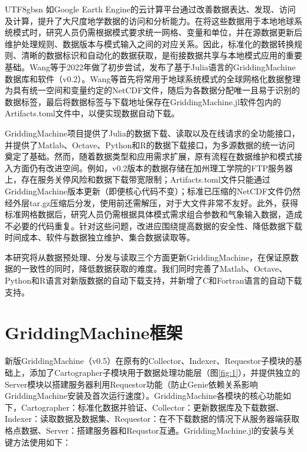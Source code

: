 \documentclass[numdoi]{chinese}
\begin{document}
\begin{CJK}{UTF8}{gbsn}
如Google Earth Engine的云计算平台通过改善数据表达、\allowbreak{}发现、\allowbreak{}访问及计算，提升了大尺度地学数据的访问和分析能力\cite{ref1}。在将这些数据用于本地地球系统模式时，研究人员仍需根据模式要求统一网格、\allowbreak{}变量和单位，并在源数据更新后维护处理规则、\allowbreak{}数据版本与模式输入之间的对应关系。因此，标准化的数据转换规则、\allowbreak{}清晰的数据标识和自动化的数据获取，是衔接数据共享与本地模式应用的重要基础。Wang等\cite{ref2}于2022年做了初步尝试，发布了基于Julia语言的GriddingMachine数据库和软件（v0.2）。Wang等\cite{ref2}首先将常用于地球系统模式的全球网格化数据整理为具有统一空间和变量约定的NetCDF文件，随后为各数据分配唯一且易于识别的数据标签，最后将数据标签与下载地址保存在GriddingMachine.jl软件包内的Artifacts.toml文件中，以便实现数据自动下载。

GriddingMachine项目提供了Julia的数据下载、读取以及在线请求的全功能接口，并提供了Matlab、Octave、Python和R的数据下载接口，为多源数据的统一访问奠定了基础。然而，随着数据类型和应用需求扩展，原有流程在数据维护和模式接入方面仍有改进空间。例如，v0.2版本的数据存储在加州理工学院的FTP服务器上，存在服务关停风险和数据下载带宽限制；Artifacts.toml文件只能通过GriddingMachine版本更新（即便核心代码不变）；标准已压缩的NetCDF文件仍然经外层tar.gz压缩后分发，使用前还需解压，对于大文件非常不友好。此外，获得标准网格数据后，研究人员仍需根据具体模式需求组合参数和气象输入数据，造成不必要的代码重复。针对这些问题，改进应围绕提高数据的安全性、降低数据下载时间成本、软件与数据独立维护、集合数据读取等。

本研究将从数据预处理、分发与读取三个方面更新GriddingMachine，在保证原数据的一致性的同时，降低数据获取的难度。我们同时完善了Matlab、Octave、Python和R语言对新版数据的自动下载支持，并新增了C和Fortran语言的自动下载支持。




\section{GriddingMachine框架}
新版GriddingMachine（v0.5）在原有的Collector、Indexer、Requestor子模块的基础上，添加了Cartographer子模块用于数据处理功能层（图\ref{fig:1}），并提供独立的Server模块以搭建服务器利用Requestor功能（防止Genie依赖关系影响GriddingMachine安装及首次运行速度）。GriddingMachine各模块的核心功能如下，Cartographer：标准化数据并验证、Collector：更新数据库及下载数据、Indexer：读取数据及数据集、Requestor：在不下载数据的情况下从服务器端获取格点数据、Server：搭建服务器和Requstor互通。GriddingMachine.jl的安装与关键方法使用如下：




\end{CJK}
\end{document}
